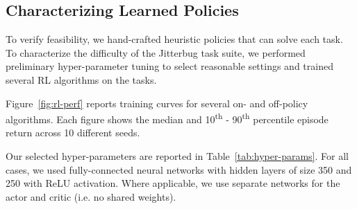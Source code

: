 \documentclass{article}
\begin{document}
\begin{table}[h!]
{
    }
    
\end{table}

\subsection{Characterizing Learned Policies}

To verify feasibility, we hand-crafted heuristic policies that can solve each task.
To characterize the difficulty of the Jitterbug task suite, we performed preliminary hyper-parameter tuning to select reasonable settings and trained several RL algorithms on the tasks.

Figure~\ref{fig:rl-perf} reports training curves for several on- and off-policy algorithms.
Each figure shows the median and 10\textsuperscript{th} - 90\textsuperscript{th} percentile episode return across 10 different seeds.

Our selected hyper-parameters are reported in Table~\ref{tab:hyper-params}.
For all cases, we used fully-connected neural networks with hidden layers of size 350 and 250 with ReLU activation.
Where applicable, we use separate networks for the actor and critic (i.e. no shared weights).
\end{document}
